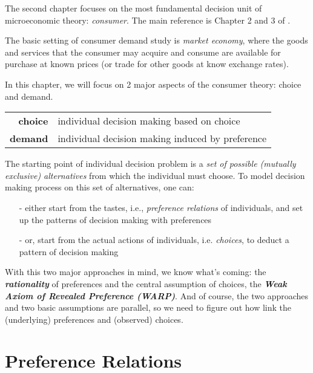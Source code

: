 \minitoc

\vspace{0.5cm}
The second chapter focuses on the most fundamental decision unit of microeconomic theory: \textit{consumer}. The main reference is Chapter 2 and 3 of \citet{mas1995microeconomic}.

The basic setting of consumer demand study is \textit{market economy}, where the goods and services that the consumer may acquire and consume are available for purchase at known prices (or trade for other goods at know exchange rates).

In this chapter, we will focus on 2 major aspects of the consumer theory: choice and demand.
\begin{center}
    \begin{tabular}{rl}
    \hline
    \textbf{choice} & individual decision making based on choice\\ 
    \textbf{demand} & individual decision making induced by preference \\ 
    \hline
    \end{tabular}
\end{center}

The starting point of individual decision problem is a \textit{set of possible (mutually exclusive) alternatives} from which the individual must choose. To model decision making process
on this set of alternatives, one can:
\begin{enumerate}
    \item[-] either start from the tastes, i.e., \textit{preference relations} of individuals, and set up the patterns of decision making with preferences
    \item[-] or, start from the actual actions of individuals, i.e. \textit{choices}, to deduct a pattern of decision making
\end{enumerate}

With this two major approaches in mind, we know what's coming: the \textit{\textbf{rationality}} of preferences and the central assumption of choices, the \textbf{\textit{Weak Axiom of Revealed Preference (WARP)}}.
And of course, the two approaches and two basic assumptions are parallel, so we need to figure out how link the (underlying) preferences and (observed) choices.

\section{Preference Relations}\label{chap2:sec1}
%

